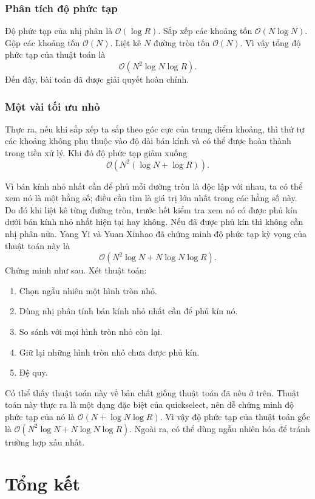 \documentclass[11pt]{article}
\newcommand{\Oh}{\mathcal{O}}
\begin{document}
\subsubsection*{Phân tích độ phức tạp}

Độ phức tạp của nhị phân là \(\Oh(\log R)\). Sắp xếp các khoảng tốn
\(\Oh(N\log N)\). Gộp các khoảng tốn \(\Oh(N)\). Liệt kê \(N\) đường tròn tốn
\(\Oh(N)\). Vì vậy tổng độ phức tạp của thuật toán là
\[
  \Oh(N^2\log N\log R).
\]
Đến đây, bài toán đã được giải quyết hoàn chỉnh.

\subsubsection*{Một vài tối ưu nhỏ}

Thực ra, nếu khi sắp xếp ta sắp theo góc cực của trung điểm khoảng, thì thứ tự
các khoảng không phụ thuộc vào độ dài bán kính và có thể được hoàn thành trong
tiền xử lý. Khi đó độ phức tạp giảm xuống
\[
  \Oh(N^2(\log N+\log R)).
\]

Vì bán kính nhỏ nhất cần để phủ mỗi đường tròn là độc lập với nhau, ta có thể
xem nó là một hằng số; điều cần tìm là giá trị lớn nhất trong các hằng số này.
Do đó khi liệt kê từng đường tròn, trước hết kiểm tra xem nó có được phủ kín
dưới bán kính nhỏ nhất hiện tại hay không. Nếu đã được phủ kín thì không cần
nhị phân nữa. Yang Yi và Yuan Xinhao đã chứng minh độ phức tạp kỳ vọng của
thuật toán này là
\[
  \Oh(N^2\log N+N\log N\log R).
\]
Chứng minh như sau. Xét thuật toán:
\begin{enumerate}
  \item Chọn ngẫu nhiên một hình tròn nhỏ.
  \item Dùng nhị phân tính bán kính nhỏ nhất cần để phủ kín nó.
  \item So sánh với mọi hình tròn nhỏ còn lại.
  \item Giữ lại những hình tròn nhỏ chưa được phủ kín.
  \item Đệ quy.
\end{enumerate}

Có thể thấy thuật toán này về bản chất giống thuật toán đã nêu ở trên. Thuật
toán này thực ra là một dạng đặc biệt của quickselect, nên dễ chứng minh độ
phức tạp của nó là \(\Oh(N+\log N\log R)\). Vì vậy độ phức tạp của thuật toán
gốc là \(\Oh(N^2\log N+N\log N\log R)\). Ngoài ra, có thể dùng ngẫu nhiên hóa
để tránh trường hợp xấu nhất.

\section{Tổng kết}
\end{document}
